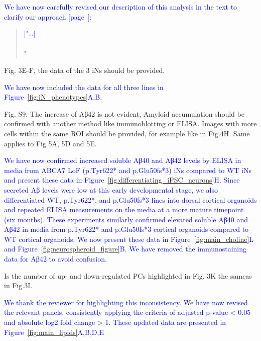 \textcolor{blue}{We have now carefully revised our description of this analysis in the text to clarify our approach [page~\pageref{quoteF-label}]:}
\begin{quote}
	\textcolor{blue}{["\dots]} \quoteF\\\\
	\quoteG\textcolor{blue}{"}
\end{quote}

Fig. 3E-F, the data of the 3 iNs should be provided.

\textcolor{blue}{We have now included the data for all three lines in Figure~\ref{fig:iN_phenotypes}A,B}.

Fig. S9. The increase of Aβ42 is not evident, Amyloid accumulation should be confirmed with another method like immunoblotting or ELISA. Images with more cells within the same ROI should be provided, for example like in Fig.4H. Same applies to Fig 5A, 5D and 5E.

\textcolor{blue}{We have now confirmed increased soluble Aβ40 and Aβ42 levels by ELISA in media from ABCA7 LoF (p.Tyr622* and p.Glu50fs*3) iNs compared to WT iNs and present these data in Figure~\ref{fig:differentiating_iPSC_neurons}H. Since secreted Aβ levels were low at this early developmental stage, we also differentiated WT, p.Tyr622*, and p.Glu50fs*3 lines into dorsal cortical organoids and repeated ELISA measurements on the media at a more mature timepoint (six months). These experiments similarly confirmed elevated soluble Aβ40 and Aβ42 in media from p.Tyr622* and p.Glu50fs*3 cortical organoids compared to WT cortical organoids. We now present these data in Figure~\ref{fig:main_choline}L and Figure~\ref{fig:neurospheroid_figure}B. We have removed the immunostaining data for Aβ42 to avoid confusion.}

Is the number of up- and down-regulated PCs highlighted in Fig. 3K the sameas in Fig.3I.

\textcolor{blue}{We thank the reviewer for highlighting this inconsistency. We have now revised the relevant panels, consistently applying the criteria of adjusted p-value < 0.05 and absolute log2 fold change > 1. These updated data are presented in Figure~\ref{fig:main_lipids}A,B,D,E}

